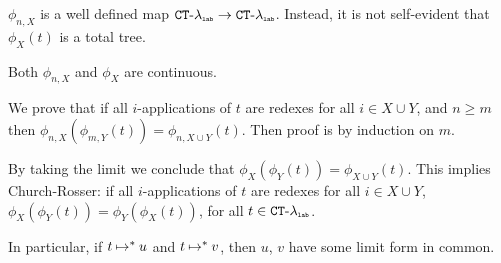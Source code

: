 $\phi_{n,X}$ is a well defined map ${{ {\tt CT} \mbox{-} \lambda}_{\mbox{\tiny \tt lab}}} \rightarrow { { {\tt CT} \mbox{-} \lambda} _ {\mbox{\tiny \tt lab}} }$.
Instead, it is not self-evident that $\phi_X(t)$ is a total tree.

Both $\phi_{n,X}$ and $\phi_X$ are continuous.

We prove that if all $i$-applications of $t$ are redexes for all $i \in X \cup Y$, and $n \ge m$
then $\phi_{n,X}(\phi_{m,Y}(t)) = \phi_{n,X \cup Y}(t)$. Then proof is by induction on $m$.

By taking the limit we conclude that $\phi_{X}(\phi_{Y}(t)) = \phi_{X \cup Y}(t)$.
This implies Church-Rosser: if all $i$-applications of $t$ are redexes for all $i \in X \cup Y$,
$\phi_{X}(\phi_{Y}(t)) = \phi_{Y}(\phi_{X}(t))$, for all $t \in { { {\tt CT} \mbox{-} \lambda} _ {\mbox{\tiny \tt lab}} }$.

In particular, if $t \mathbin{\mapsto}^* u$ and $t \mathbin{\mapsto}^* v$, then $u$, $v$ have some limit form in common.

